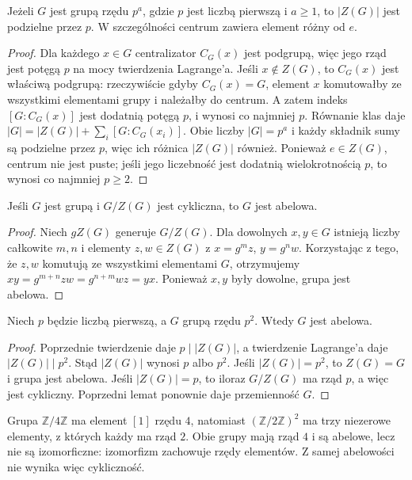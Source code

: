 \begin{twierdzenie}
\label{aa:tw:centrum-pgrupy}
Jeżeli $G$ jest grupą rzędu $p^a$, gdzie $p$ jest liczbą pierwszą
i $a\ge1$, to $|Z(G)|$ jest podzielne przez $p$.
W szczególności centrum zawiera element różny od $e$.
\end{twierdzenie}
\begin{proof}
Dla każdego $x\in G$ centralizator $C_G(x)$ jest podgrupą,
więc jego rząd jest potęgą $p$ na mocy twierdzenia Lagrange'a.
Jeśli $x\notin Z(G)$, to $C_G(x)$ jest właściwą podgrupą:
rzeczywiście gdyby $C_G(x)=G$, element $x$ komutowałby
ze wszystkimi elementami grupy i należałby do centrum.
A zatem indeks $[G:C_G(x)]$ jest dodatnią potęgą $p$,
i wynosi co najmniej $p$.
Równanie klas daje
$|G|=|Z(G)|+\sum_i [G:C_G(x_i)]$.
Obie liczby $|G|=p^a$ i każdy składnik sumy są podzielne
przez $p$, więc ich różnica $|Z(G)|$ również.
Ponieważ $e\in Z(G)$, centrum nie jest puste;
jeśli jego liczebność jest dodatnią wielokrotnością $p$,
to wynosi co najmniej $p\ge2$.
\end{proof}

\begin{lemat}
\label{aa:lem:cykliczny-centrum}
Jeśli $G$ jest grupą i $G/Z(G)$ jest cykliczna,
to $G$ jest abelowa.
\end{lemat}
\begin{proof}
Niech $gZ(G)$ generuje $G/Z(G)$.
Dla dowolnych $x,y\in G$ istnieją liczby całkowite $m,n$
i elementy $z,w\in Z(G)$ z $x=g^m z$, $y=g^n w$.
Korzystając z tego, że $z,w$ komutują ze wszystkimi
elementami $G$, otrzymujemy
$xy=g^{m+n}zw=g^{n+m}wz=yx$.
Ponieważ $x,y$ były dowolne, grupa jest abelowa.
\end{proof}

\begin{twierdzenie}
\label{aa:tw:p2-abelowa}
Niech $p$ będzie liczbą pierwszą, a $G$ grupą rzędu $p^2$.
Wtedy $G$ jest abelowa.
\end{twierdzenie}
\begin{proof}
Poprzednie twierdzenie daje $p\mid |Z(G)|$,
a twierdzenie Lagrange'a daje $|Z(G)|\mid p^2$.
Stąd $|Z(G)|$ wynosi $p$ albo $p^2$.
Jeśli $|Z(G)|=p^2$, to $Z(G)=G$ i grupa jest abelowa.
Jeśli $|Z(G)|=p$, to iloraz $G/Z(G)$ ma rząd $p$,
a więc jest cykliczny. Poprzedni lemat ponownie daje
przemienność $G$.
\end{proof}

\begin{przyklad}
Grupa $\mathbb Z/4\mathbb Z$ ma element $[1]$ rzędu $4$,
natomiast $(\mathbb Z/2\mathbb Z)^2$ ma trzy niezerowe
elementy, z których każdy ma rząd $2$.
Obie grupy mają rząd $4$ i są abelowe,
lecz nie są izomorficzne: izomorfizm zachowuje rzędy elementów.
Z samej abelowości nie wynika więc cykliczność.
\end{przyklad}


